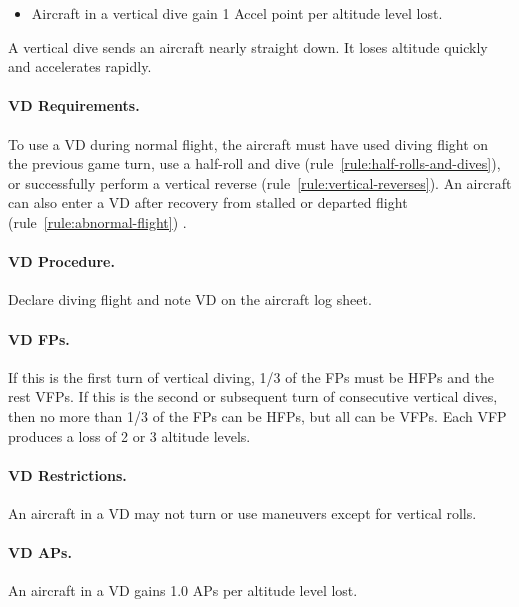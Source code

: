 {\begin{itemize}
    \item{} Aircraft in a vertical dive gain 1 Accel point per altitude level lost.

\end{itemize}
}{

A vertical dive sends an aircraft nearly straight down. It loses altitude quickly and accelerates rapidly.

\paragraph{VD Requirements.} To use a VD during normal flight, the aircraft must have used diving flight on the previous game turn, use a half-roll and dive (rule~\ref{rule:half-rolls-and-dives}), or successfully perform a vertical reverse (rule~\ref{rule:vertical-reverses}). An aircraft can also enter a VD after recovery from stalled or departed flight (rule~\ref{rule:abnormal-flight}) .

\paragraph{VD Procedure.} Declare diving flight and note VD on the aircraft log sheet. 

\paragraph{VD FPs.} If this is the first turn of vertical diving, 1/3 of the FPs must be HFPs and the rest VFPs. If this is the second or subsequent turn of consecutive vertical dives, then no more than 1/3 of the FPs can be HFPs, but all can be VFPs. Each VFP produces a loss of 2 or 3 altitude levels.

\paragraph{VD Restrictions.} An aircraft in a VD may not turn or use maneuvers except for vertical rolls. 

\paragraph{VD APs.} An aircraft in a VD gains 1.0 APs per altitude level lost.

}
